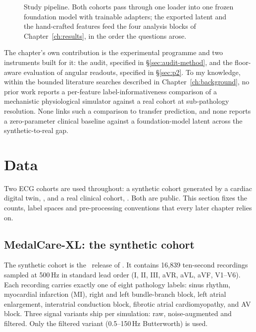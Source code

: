 \begin{figure}[tb]
\centering
\resizebox{\textwidth}{!}{}
\caption{Study pipeline. Both cohorts pass through one loader into one frozen foundation model with trainable adapters; the exported latent and the hand-crafted features feed the four analysis blocks of Chapter~\ref{ch:results}, in the order the questions arose.}
\label{fig:pipeline}
\end{figure}

The chapter's own contribution is the experimental programme and two instruments built for it: the audit, specified in \S\ref{sec:audit-method}, and the floor-aware evaluation of angular readouts, specified in \S\ref{sec:p2}. To my knowledge, within the bounded literature searches described in Chapter~\ref{ch:background}, no prior work reports a per-feature label-informativeness comparison of a mechanistic physiological simulator against a real cohort at sub-pathology resolution. None links such a comparison to transfer prediction, and none reports a zero-parameter clinical baseline against a foundation-model latent across the synthetic-to-real gap. 

\section{Data}
\label{sec:data}

Two ECG cohorts are used throughout: a synthetic cohort generated by a cardiac digital twin, \medalcare, and a real clinical cohort, \ptbxl. Both are public. This section fixes the counts, label spaces and pre-processing conventions that every later chapter relies on.

\subsection{MedalCare-XL: the synthetic cohort}
\label{sec:data-medalcare}

The synthetic cohort is the \medalcare\ release of \citet{gillette2023medalcare}. It contains 16,839 ten-second recordings sampled at 500\,Hz in standard lead order (I, II, III, aVR, aVL, aVF, V1--V6). Each recording carries exactly one of eight pathology labels: sinus rhythm, myocardial infarction (MI), right and left bundle-branch block, left atrial enlargement, interatrial conduction block, fibrotic atrial cardiomyopathy, and AV block. Three signal variants ship per simulation: raw, noise-augmented and filtered. Only the filtered variant (0.5--150\,Hz Butterworth) is used. 

